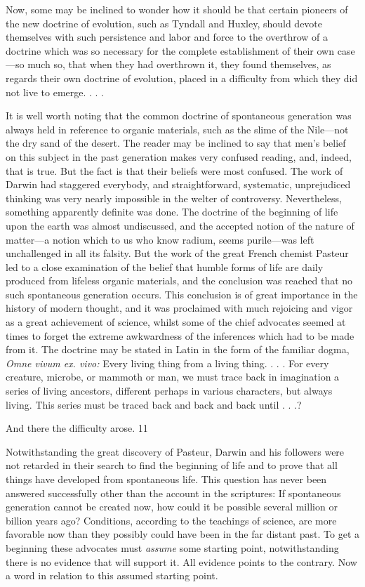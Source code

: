Now, some may be inclined to wonder how it should be that certain pioneers of the new
doctrine of evolution, such as Tyndall and Huxley, should devote themselves with such
persistence and labor and force to the overthrow of a doctrine which was so necessary for the
complete establishment of their own case—so much so, that when they had overthrown it,
they found themselves, as regards their own doctrine of evolution, placed in a difficulty from
which they did not live to emerge. . . .

It is well worth noting that the common doctrine of spontaneous generation was always held
in reference to organic materials, such as the slime of the Nile—not the dry sand of the
desert. The reader may be inclined to say that men's belief on this subject in the past
generation makes very confused reading, and, indeed, that is true. But the fact is that their
beliefs were most confused. The work of Darwin had staggered everybody, and
straightforward, systematic, unprejudiced thinking was very nearly impossible in the welter
of controversy. Nevertheless, something apparently definite was done. The doctrine of the
beginning of life upon the earth was almost undiscussed, and the accepted notion of the
nature of matter—a notion which to us who know radium, seems purile—was left
unchallenged in all its falsity. But the work of the great French chemist Pasteur led to a close
examination of the belief that humble forms of life are daily produced from lifeless organic
materials, and the conclusion was reached that no such spontaneous generation occurs.
This conclusion is of great importance in the history of modern thought, and it was
proclaimed with much rejoicing and vigor as a great achievement of science, whilst some of
the chief advocates seemed at times to forget the extreme awkwardness of the inferences
which had to be made from it. The doctrine may be stated in Latin in the form of the familiar
dogma, \textit{Omne vivum ex. vivo:} Every living thing from a living thing. . . . For every creature,
microbe, or mammoth or man, we must trace back in imagination a series of living ancestors,
different perhaps in various characters, but always living. This series must be traced back and
back and back until . . .?

And there the difficulty arose. 11

Notwithstanding the great discovery of Pasteur, Darwin and his followers were not retarded
in their search to find the beginning of life and to prove that all things have developed from
spontaneous life. This question has never been answered successfully other than the account
in the scriptures: If spontaneous generation cannot be created now, how could it be possible
several million or billion years ago? Conditions, according to the teachings of science, are
more favorable now than they possibly could have been in the far distant past. To get a
beginning these advocates must \textit{assume} some starting point, notwithstanding there is no
evidence that will support it. All evidence points to the contrary. Now a word in relation to
this assumed starting point.

